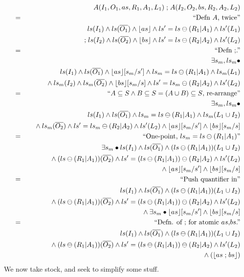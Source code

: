 \begin{eqnarray*}
  && A(I_1,O_1,as,R_1,A_1,L_1) \mathrel{;} A(I_2,O_2,bs,R_2,A_2,L_2)
\\&=&\textrm{``Defn $A$, twice''}
\\&& ls(I_1) \land ls(\overline{O_1}) \land \lfloor as\rfloor
     \land ls'=ls\ominus(R_1|A_1) \land ls'(L_1)
\\&& {} \mathrel{;}
     ls(I_2) \land ls(\overline{O_2}) \land \lfloor bs\rfloor
     \land ls'=ls\ominus(R_2|A_2) \land ls'(L_2)
\\&=&\textrm{``Defn $\mathrel{;}$.''}
\\&& \exists s_m,ls_m \bullet
\\&& \qquad ls(I_1) \land ls(\overline{O_1}) \land \lfloor as\rfloor[s_m/s']
     \land ls_m = ls\ominus(R_1|A_1) \land ls_m(L_1)
\\&& \quad {} \land
     ls_m(I_2) \land ls_m(\overline{O_2}) \land \lfloor bs\rfloor[s_m/s]
     \land ls' = ls_m\ominus(R_2|A_2) \land ls'(L_2)
\\&=&\textrm{``$A \subseteq S \land B \subseteq S = (A \cup B) \subseteq S$, re-arrange''}
\\&& \exists s_m,ls_m \bullet
\\&& \qquad ls(I_1) \land ls(\overline{O_1}) \land ls_m = ls\ominus(R_1|A_1)
     \land ls_m(L_1 \cup I_2)
\\&& \quad {}\land ls_m(\overline{O_2}) \land ls' = ls_m\ominus(R_2|A_2) \land ls'(L_2)
     \land \lfloor as\rfloor[s_m/s'] \land \lfloor bs\rfloor[s_m/s]
\\&=&\textrm{``One-point, $ls_m = ls\ominus(R_1|A_1)$''}
\\&& \exists s_m \bullet ls(I_1) \land ls(\overline{O_1})
     \land (ls\ominus(R_1|A_1))(L_1 \cup I_2)
\\&& \qquad {}\land (ls\ominus(R_1|A_1))(\overline{O_2})
      \land ls' = (ls\ominus(R_1|A_1))\ominus(R_2|A_2) \land ls'(L_2)
\\&& \qquad {} \land \lfloor as\rfloor[s_m/s'] \land \lfloor bs\rfloor[s_m/s]
\\&=&\textrm{``Push quantifier in''}
\\&& ls(I_1)  \land ls(\overline{O_1})
     \land (ls\ominus(R_1|A_1))(L_1 \cup I_2)
\\&& {}\land (ls\ominus(R_1|A_1))(\overline{O_2})
      \land ls' = (ls\ominus(R_1|A_1))\ominus(R_2|A_2) \land ls'(L_2)
\\&& {}\land \exists s_m \bullet \lfloor as\rfloor[s_m/s'] \land \lfloor bs\rfloor[s_m/s]
\\&=&\textrm{``Defn. of $\mathrel{;}$ for atomic $as$,$bs$.''}
\\&& ls(I_1)  \land ls(\overline{O_1})
     \land (ls\ominus(R_1|A_1))(L_1 \cup I_2)
\\&& {}\land (ls\ominus(R_1|A_1))(\overline{O_2})
      \land ls' = (ls\ominus(R_1|A_1))\ominus(R_2|A_2) \land ls'(L_2)
\\&& {}\land (\lfloor as \mathrel{;} bs\rfloor)
\end{eqnarray*}
We now take stock, and seek to simplify some stuff.

